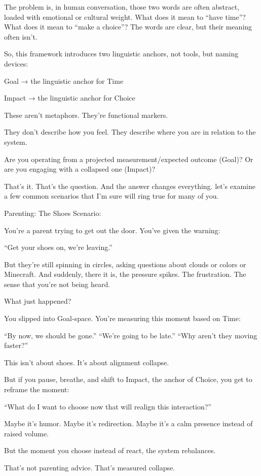 \documentclass[11pt]{article}
\begin{document}
The problem is, in human conversation, those two words are often abstract, loaded with emotional or cultural weight. What does it mean to “have time”? What does it mean to “make a choice”? The words are clear, but their meaning often isn’t.

So, this framework introduces two linguistic anchors, not tools, but naming devices:

Goal → the linguistic anchor for Time

Impact → the linguistic anchor for Choice

These aren’t metaphors. They’re functional markers.

They don’t describe how you feel.
They describe where you are in relation to the system.

Are you operating from a projected measurement/expected outcome (Goal)? 
Or are you engaging with a collapsed one (Impact)?

That’s it. That’s the question.
And the answer changes everything.
let’s examine a few common scenarios that I’m sure will ring true for many of you. 

Parenting: The Shoes Scenario:

You’re a parent trying to get out the door. You’ve given the warning:

“Get your shoes on, we’re leaving.”

But they’re still spinning in circles, asking questions about clouds or colors or Minecraft. And suddenly, there it is, the pressure spikes. The frustration. The sense that you’re not being heard.

What just happened?

You slipped into Goal-space.
You’re measuring this moment based on Time:

“By now, we should be gone.”
“We’re going to be late.”
“Why aren’t they moving faster?”

This isn’t about shoes. It’s about alignment collapse.

But if you pause, breathe, and shift to Impact, the anchor of Choice, you get to reframe the moment:

“What do I want to choose now that will realign this interaction?”

Maybe it’s humor. Maybe it’s redirection. Maybe it’s a calm presence instead of raised volume.

But the moment you choose instead of react, the system rebalances.

That’s not parenting advice.
That’s measured collapse.
\end{document}
